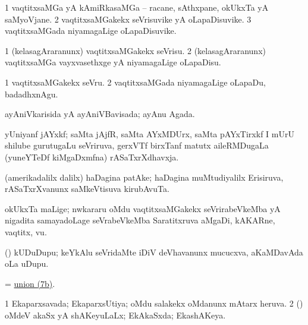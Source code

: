\bentry
{} 
\gl{\nA}
\expl{}
\bmng
\bnum
\num{1} vaqtitxsaMGa yA kAmiRkasaMGa -- racane, sAthxpane, okUkxTa yA saMyoVjane. 
\num{2} vaqtitxsaMGakekx seVrisuvike yA oLapaDisuvike. 
\num{3} vaqtitxsaMGada niyamagaLige oLapaDisuvike. 
\enum
\emng
\eentry

\bentry
{} 
\gl{\sakirx}
\expl{}
\bmng
\bnum
\num{1} (kelasagAraranunx) vaqtitxsaMGakekx seVrisu. 
\num{2} (kelasagAraranunx) vaqtitxsaMGa vayxvasethxge yA niyamagaLige oLapaDisu. 
\enum
\emng

\noindent
\gl{\akirx}
\expl{}
\bmng
\bnum
\num{1} vaqtitxsaMGakekx seVru. 
\num{2} vaqtitxsaMGada niyamagaLige oLapaDu, badadhxnAgu. 
\enum
\emng
\eentry

\bentry
{} 
\gl{\gu}
\expl{}
\bmng
ayAniVkarisida yA ayAniVBavisada; ayAnu Agada. 
\emng
\eentry

\bentry
{} 
\pron{}
\gl{\nA}
\expl{}
\bmng
yUniyanf jAYxkf; saMta jAjfR, saMta AYxMDUrx, saMta pAYxTirxkf I mUrU shilube gurutugaLu seVriruva, gerxVTf birxTanf matutx aileRMDugaLa (yuneYTeDf kiMgaDxmfna) rASaTxrXdhavxja. 
\emng
\eentry

\bentry
{} 
\pron{}
\gl{\nA}
\expl{}
\bmng
(amerikadalilx dalilx) haDagina patAke; haDagina muMtudiyalilx Erisiruva, rASaTxrXvanunx saMkeVtisuva kirubAvuTa. 
\emng
\eentry

\bentry
{}
\gl{\nA}
\expl{}
\bmng
okUkxTa maLige; nwkararu oMdu vaqtitxsaMGakekx seVrirabeVkeMba yA nigadita samayadoLage seVrabeVkeMba Saratitxruva aMgaDi, kAKARne, vaqtitx, \mo vu. 
\emng
\eentry

\bentry
{}
\gl{\nA}
\expl{}
\bmng
(\ame) kUDuDupu; keYkAlu seVridaMte iDiV deVhavanunx mucucxva, aKaMDavAda oLa uDupu.  
\emng
\eentry

\bentry
{} 
\gl{\nA}
\expl{}
\bmng
= \hyperlink{union(7)b}{union (7b)}. 
\emng
\eentry

\bentry
{} 
\gl{\gu}
\expl{}
\bmng
\bnum
\num{1} Ekaparxsavada; EkaparxsUtiya; oMdu salakekx oMdanunx mAtarx heruva. 
\num{2} (\savi) oMdeV akaSx yA shAKeyuLaLx; EkAkaSxda; EkashAKeya. 
\enum
\emng
\eentry

